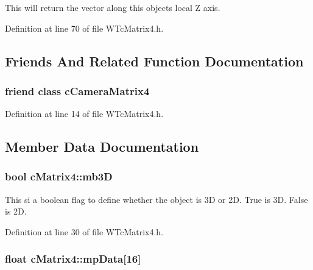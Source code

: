This will return the vector along this objects local Z axis. 



Definition at line 70 of file WTcMatrix4.h.



\subsection{Friends And Related Function Documentation}
\hypertarget{classc_matrix4_ad892cad8874ae954d2e9de55b17ded93}{
\subsubsection[{cCameraMatrix4}]{\setlength{\rightskip}{0pt plus 5cm}friend class {\bf cCameraMatrix4}}}
\label{classc_matrix4_ad892cad8874ae954d2e9de55b17ded93}


Definition at line 14 of file WTcMatrix4.h.



\subsection{Member Data Documentation}
\hypertarget{classc_matrix4_ac0ebba0d10d97c6657dccd1575f761ab}{
\subsubsection[{mb3D}]{\setlength{\rightskip}{0pt plus 5cm}bool {\bf cMatrix4::mb3D}}}
\label{classc_matrix4_ac0ebba0d10d97c6657dccd1575f761ab}


This si a boolean flag to define whether the object is 3D or 2D. True is 3D. False is 2D. 



Definition at line 30 of file WTcMatrix4.h.

\hypertarget{classc_matrix4_a317862be8d837351569f993a32fc687c}{
\subsubsection[{mpData}]{\setlength{\rightskip}{0pt plus 5cm}float {\bf cMatrix4::mpData}\mbox{[}16\mbox{]}}}
\label{classc_matrix4_a317862be8d837351569f993a32fc687c}


